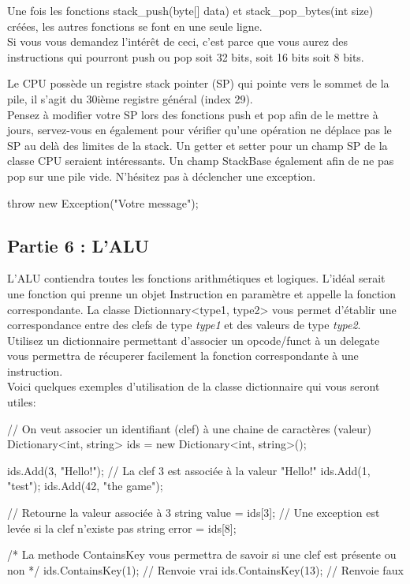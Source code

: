Une fois les fonctions stack\_push(byte[] data) et stack\_pop\_bytes(int size)
créées, les autres fonctions se font en une seule ligne.\\ Si vous vous demandez
l'intérêt de ceci, c'est parce que vous aurez des instructions qui pourront push
ou pop soit 32 bits, soit 16 bits soit 8 bits.

Le CPU possède un registre stack pointer (SP) qui pointe vers le sommet de la
pile, il s'agit du 30ième registre général (index 29).\\ Pensez à modifier votre
SP lors des fonctions push et pop afin de le mettre à jours, servez-vous en
également pour vérifier qu'une opération ne déplace pas le SP au delà des
limites de la stack. Un getter et setter pour un champ SP de la classe CPU
seraient intéressants. Un champ StackBase également afin de ne pas pop sur une
pile vide. N'hésitez pas à déclencher une exception.
\begin{code}
  throw new Exception("Votre message");
\end{code}

\subsection{Partie 6 : L'ALU}

L'ALU contiendra toutes les fonctions arithmétiques et logiques. L'idéal serait
une fonction qui prenne un objet Instruction en paramètre et appelle la fonction
correspondante.  La classe Dictionnary<type1, type2> vous permet d'établir une
correspondance entre des clefs de type \textit{type1} et des valeurs de type
\textit{type2}.\\ Utilisez un dictionnaire permettant d'associer un opcode/funct
à un delegate vous permettra de récuperer facilement la fonction correspondante
à une instruction.\\ Voici quelques exemples d'utilisation de la classe
dictionnaire qui vous seront utiles:
\begin{code}
  // On veut associer un identifiant (clef) à une chaine de caractères (valeur)
  Dictionary<int, string> ids = new Dictionary<int, string>();

  ids.Add(3, "Hello!"); // La clef 3 est associée à la valeur "Hello!"
  ids.Add(1, "test");
  ids.Add(42, "the game");

  // Retourne la valeur associée à 3
  string value = ids[3];
  // Une exception est levée si la clef n'existe pas
  string error = ids[8];

  /*
  La methode ContainsKey vous permettra de savoir si une clef est présente ou
  non
  */
  ids.ContainsKey(1); // Renvoie vrai
  ids.ContainsKey(13); // Renvoie faux
\end{code}
